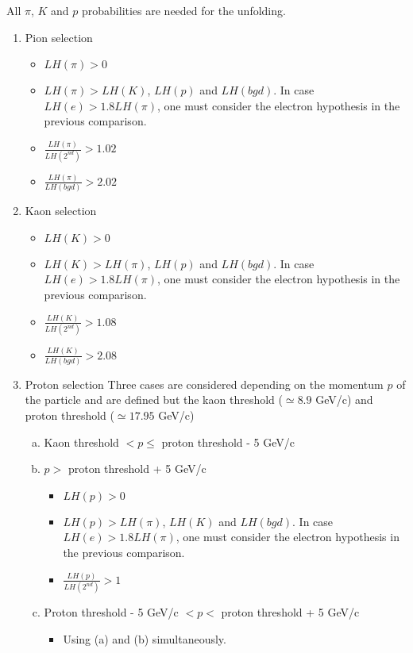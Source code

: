 All $\pi$, $K$ and $p$ probabilities are needed for the unfolding.

\begin{enumerate}
  \item Pion selection
  \begin{itemize}
    \item $LH(\pi) > 0$
    \item $LH(\pi) > LH(K)$, $LH(p)$ and $LH(bgd)$. In case $LH(e) > 1.8LH(\pi)$, one must consider the electron hypothesis
    in the previous comparison.
    \item $\frac{LH(\pi)}{LH(2^{nd})}>1.02$
    \item $\frac{LH(\pi)}{LH(bgd)}>2.02$
  \end{itemize}
  \item Kaon selection
  \begin{itemize}
    \item $LH(K) > 0$
    \item $LH(K) > LH(\pi)$, $LH(p)$ and $LH(bgd)$. In case $LH(e) > 1.8LH(\pi)$, one must consider the electron hypothesis
    in the previous comparison.
    \item $\frac{LH(K)}{LH(2^{nd})}>1.08$
    \item $\frac{LH(K)}{LH(bgd)}>2.08$
  \end{itemize}
  \item Proton selection
  Three cases are considered depending on the momentum $p$ of the particle and are defined but the kaon threshold ($\simeq 8.9$ GeV/c)
  and proton threshold ($\simeq 17.95$ GeV/c)
  \begin{enumerate}[(a)]
    \item Kaon threshold $< p \leq$ proton threshold - 5 GeV/c
    \item $p >$ proton threshold + 5 GeV/c
    \begin{itemize}
      \item $LH(p) > 0$
      \item $LH(p) > LH(\pi)$, $LH(K)$ and $LH(bgd)$. In case $LH(e) > 1.8LH(\pi)$, one must consider the electron hypothesis
      in the previous comparison.
      \item $\frac{LH(p)}{LH(2^{nd})}>1$
    \end{itemize}
    \item Proton threshold - 5 GeV/c $< p <$ proton threshold + 5 GeV/c
    \begin{itemize}
      \item Using (a) and (b) simultaneously.
    \end{itemize}
  \end{enumerate}
\end{enumerate}

